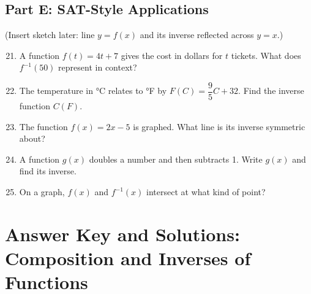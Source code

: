 \documentclass[12pt]{article}
\begin{document}
\subsection*{Part E: SAT-Style Applications}
(Insert sketch later: line \(y = f(x)\) and its inverse reflected across \(y = x\).)

\begin{enumerate}
  \setcounter{enumi}{20}
  \item A function \(f(t) = 4t + 7\) gives the cost in dollars for \(t\) tickets.  
  What does \(f^{-1}(50)\) represent in context?
  \item The temperature in °C relates to °F by \(F(C) = \dfrac{9}{5}C + 32.\)  
  Find the inverse function \(C(F)\).
  \item The function \(f(x) = 2x - 5\) is graphed. What line is its inverse symmetric about?
  \item A function \(g(x)\) doubles a number and then subtracts 1.  
  Write \(g(x)\) and find its inverse.
  \item On a graph, \(f(x)\) and \(f^{-1}(x)\) intersect at what kind of point?
\end{enumerate}

\newpage


\section*{Answer Key and Solutions: Composition and Inverses of Functions}
\end{document}
